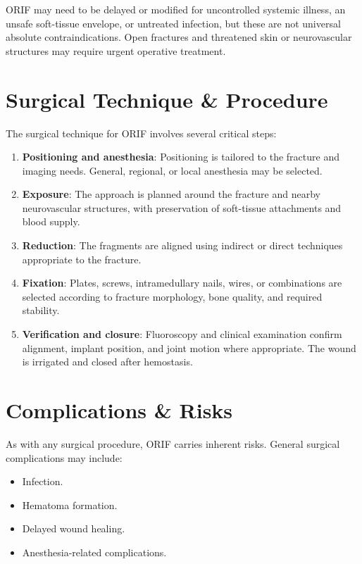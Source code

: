 ORIF may need to be delayed or modified for uncontrolled systemic illness, an unsafe soft-tissue envelope, or untreated infection, but these are not universal absolute contraindications. Open fractures and threatened skin or neurovascular structures may require urgent operative treatment.

\section*{Surgical Technique \& Procedure}

The surgical technique for ORIF involves several critical steps:

\begin{enumerate}
  \item \textbf{Positioning and anesthesia}: Positioning is tailored to the fracture and imaging needs. General, regional, or local anesthesia may be selected.
  \item \textbf{Exposure}: The approach is planned around the fracture and nearby neurovascular structures, with preservation of soft-tissue attachments and blood supply.
  \item \textbf{Reduction}: The fragments are aligned using indirect or direct techniques appropriate to the fracture.
  \item \textbf{Fixation}: Plates, screws, intramedullary nails, wires, or combinations are selected according to fracture morphology, bone quality, and required stability.
  \item \textbf{Verification and closure}: Fluoroscopy and clinical examination confirm alignment, implant position, and joint motion where appropriate. The wound is irrigated and closed after hemostasis.
\end{enumerate}

\section*{Complications \& Risks}

As with any surgical procedure, ORIF carries inherent risks. General surgical complications may include:

\begin{itemize}
  \item Infection.
  \item Hematoma formation.
  \item Delayed wound healing.
  \item Anesthesia-related complications.
\end{itemize}

